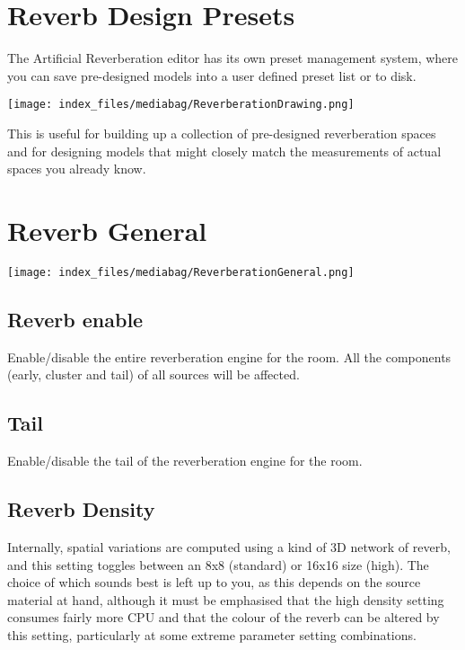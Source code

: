 \documentclass[
  letterpaper,
  DIV=11,
  numbers=noendperiod]{scrreport}
\begin{document}
\hypertarget{reverb-design-presets}{%
\section{Reverb Design Presets}\label{reverb-design-presets}}

The Artificial Reverberation editor has its own preset management
system, where you can save pre-designed models into a user defined
preset list or to disk.

\texttt{[image: index\_files/mediabag/ReverberationDrawing.png]}

This is useful for building up a collection of pre-designed
reverberation spaces and for designing models that might closely match
the measurements of actual spaces you already know.

\hypertarget{reverb-general}{%
\section{Reverb General}\label{reverb-general}}

\texttt{[image: index\_files/mediabag/ReverberationGeneral.png]}

\hypertarget{reverb-enable}{%
\subsection{Reverb enable}\label{reverb-enable}}

Enable/disable the entire reverberation engine for the room. All the
components (early, cluster and tail) of all sources will be affected.

\hypertarget{tail}{%
\subsection{Tail}\label{tail}}

Enable/disable the tail of the reverberation engine for the room.

\hypertarget{reverb-density}{%
\subsection{Reverb Density}\label{reverb-density}}

Internally, spatial variations are computed using a kind of 3D network
of reverb, and this setting toggles between an 8x8 (standard) or 16x16
size (high). The choice of which sounds best is left up to you, as this
depends on the source material at hand, although it must be emphasised
that the high density setting consumes fairly more CPU and that the
colour of the reverb can be altered by this setting, particularly at
some extreme parameter setting combinations.
\end{document}
